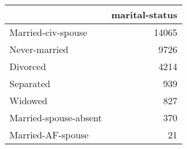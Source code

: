 \begin{tabular}{lr}
\toprule
{} &  marital-status \\
\midrule
 Married-civ-spouse    &           14065 \\
 Never-married         &            9726 \\
 Divorced              &            4214 \\
 Separated             &             939 \\
 Widowed               &             827 \\
 Married-spouse-absent &             370 \\
 Married-AF-spouse     &              21 \\
\bottomrule
\end{tabular}
